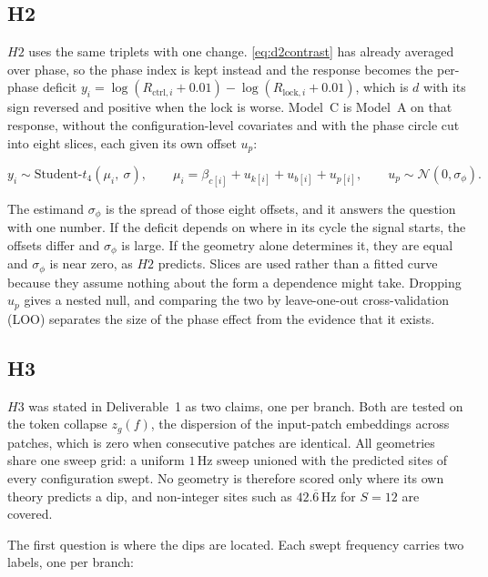 

\subsection{H2}
$H2$ uses the same triplets with one change. \autoref{eq:d2contrast} has already averaged over phase, so the phase index is kept instead and the response becomes the per-phase deficit $y_i = \log(R_{\text{ctrl},i}+0.01)-\log(R_{\text{lock},i}+0.01)$, which is $d$ with its sign reversed and positive when the lock is worse. Model~C is Model~A on that response, without the configuration-level covariates and with the phase circle cut into eight slices, each given its own offset $u_p$:

\begin{equation}
\label{eq:d2phase}
y_i \sim \text{Student-}t_4(\mu_i,\ \sigma),
\qquad
\mu_i = \beta_{c[i]} + u_{k[i]} + u_{b[i]} + u_{p[i]},
\qquad
u_p \sim \mathcal{N}(0, \sigma_\phi).
\end{equation}

The estimand $\sigma_\phi$ is the spread of those eight offsets, and it answers the question with one number. If the deficit depends on where in its cycle the signal starts, the offsets differ and $\sigma_\phi$ is large. If the geometry alone determines it, they are equal and $\sigma_\phi$ is near zero, as $H2$ predicts. Slices are used rather than a fitted curve because they assume nothing about the form a dependence might take. Dropping $u_p$ gives a nested null, and comparing the two by leave-one-out cross-validation (LOO) separates the size of the phase effect from the evidence that it exists.

\subsection{H3}
$H3$ was stated in Deliverable~1 as two claims, one per branch. Both are tested on the token collapse $z_g(f)$, the dispersion of the input-patch embeddings across patches, which is zero when consecutive patches are identical. All geometries share one sweep grid: a uniform $1$\,Hz sweep unioned with the predicted sites of every configuration swept. No geometry is therefore scored only where its own theory predicts a dip, and non-integer sites such as $42.\overline{6}$\,Hz for $S{=}12$ are covered.

The first question is where the dips are located. Each swept frequency carries two labels, one per branch:

